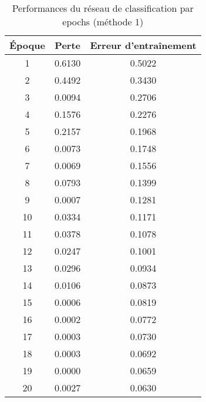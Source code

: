 \documentclass[a4paper,11pt]{article}
\begin{document}
\begin{table}[h!]
    \centering
    \begin{tabular}{|c|c|c|}
        \hline
        \textbf{Époque} & \textbf{Perte} & \textbf{Erreur d'entraînement} \\
        \hline
        1  & 0.6130  & 0.5022 \\
        2  & 0.4492  & 0.3430 \\
        3  & 0.0094  & 0.2706 \\
        4  & 0.1576  & 0.2276 \\
        5  & 0.2157  & 0.1968 \\
        6  & 0.0073  & 0.1748 \\
        7  & 0.0069  & 0.1556 \\
        8  & 0.0793  & 0.1399 \\
        9  & 0.0007  & 0.1281 \\
        10 & 0.0334  & 0.1171 \\
        11 & 0.0378  & 0.1078 \\
        12 & 0.0247  & 0.1001 \\
        13 & 0.0296  & 0.0934 \\
        14 & 0.0106  & 0.0873 \\
        15 & 0.0006  & 0.0819 \\
        16 & 0.0002  & 0.0772 \\
        17 & 0.0003  & 0.0730 \\
        18 & 0.0003  & 0.0692 \\
        19 & 0.0000  & 0.0659 \\
        20 & 0.0027  & 0.0630 \\
        \hline
    \end{tabular}
    \caption{Performances du réseau de classification par epochs (méthode 1)}
    \label{tab:performances}
\end{table}
\end{document}
